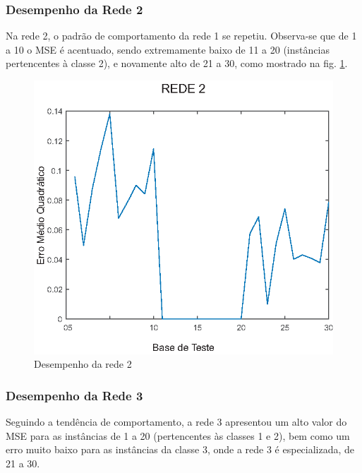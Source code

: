 \subsubsection{Desempenho da Rede 2}

Na rede 2, o padrão de comportamento da rede 1 se repetiu. Observa-se que de 1 a 10 o MSE é acentuado, sendo extremamente baixo de 11 a 20 (instâncias pertencentes à classe 2), e novamente alto de 21 a 30, como mostrado na fig. \ref{figura:rede2}.

\begin{figure}[H]

\centering %
\includegraphics{04-Figuras/MSE_DesempenhoNet2}

\caption{Desempenho da rede 2}

\label{figura:rede2}

\end{figure}

\subsubsection{Desempenho da Rede 3}

Seguindo a tendência de comportamento, a rede 3 apresentou um alto valor do MSE para as instâncias de 1 a 20 (pertencentes às classes 1 e 2), bem como um erro muito baixo para as instâncias da classe 3, onde a rede 3 é especializada, de 21 a 30.

